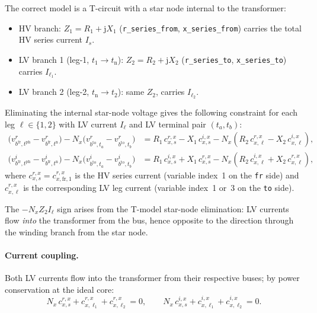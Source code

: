 \documentclass[11pt,a4paper]{article}
\newcommand{\vr}[2]{v^r_{#1,#2}}
\newcommand{\vi}[2]{v^i_{#1,#2}}
\begin{document}
The correct model is a T-circuit with a star node internal to the transformer:
\begin{itemize}
  \item HV branch: $Z_1 = R_1 + \mathrm{j}X_1$
        (\texttt{r\_series\_from}, \texttt{x\_series\_from})
        carries the total HV series current $I_s$.
  \item LV branch 1 (leg-1, $t_1 \to t_\text{n}$): $Z_2 = R_2 + \mathrm{j}X_2$
        (\texttt{r\_series\_to}, \texttt{x\_series\_to}) carries $I_{\ell_1}$.
  \item LV branch 2 (leg-2, $t_\text{n} \to t_2$): same $Z_2$, carries
        $I_{\ell_2}$.
\end{itemize}

Eliminating the internal star-node voltage gives the following constraint
for each leg $\ell \in \{1, 2\}$ with LV current $I_{\ell}$ and LV terminal
pair $(t_a, t_b)$:
%
\begin{align}
  \bigl(\vr{b^\text{fr}}{t^\text{ph}} - \vr{b^\text{fr}}{t^\text{n}}\bigr)
  - N_x\bigl(\vr{b^\text{to}}{t_a} - \vr{b^\text{to}}{t_b}\bigr)
  &= R_1\,c^{r,x}_{x,s} - X_1\,c^{i,x}_{x,s}
     - N_x\!\left(R_2\,c^{r,x}_{x,\ell} - X_2\,c^{i,x}_{x,\ell}\right),
  \label{eq:ct-v-r}\\
  \bigl(\vi{b^\text{fr}}{t^\text{ph}} - \vi{b^\text{fr}}{t^\text{n}}\bigr)
  - N_x\bigl(\vi{b^\text{to}}{t_a} - \vi{b^\text{to}}{t_b}\bigr)
  &= R_1\,c^{i,x}_{x,s} + X_1\,c^{r,x}_{x,s}
     - N_x\!\left(R_2\,c^{i,x}_{x,\ell} + X_2\,c^{r,x}_{x,\ell}\right),
  \label{eq:ct-v-i}
\end{align}
%
where $c^{r,x}_{x,s} = c^{r,x}_{x,\text{fr},1}$ is the HV series current
(variable index~1 on the \texttt{fr} side) and $c^{r,x}_{x,\ell}$ is the
corresponding LV leg current (variable index~1 or~3 on the \texttt{to} side).

The $-N_x Z_2 I_\ell$ sign arises from the T-model star-node elimination:
LV currents flow \emph{into} the transformer from the bus, hence opposite to
the direction through the winding branch from the star node.

\paragraph{Current coupling.}
Both LV currents flow into the transformer from their respective buses;
by power conservation at the ideal core:
%
\begin{equation}
  N_x\,c^{r,x}_{x,s} + c^{r,x}_{x,\ell_1} + c^{r,x}_{x,\ell_2} = 0,
  \qquad
  N_x\,c^{i,x}_{x,s} + c^{i,x}_{x,\ell_1} + c^{i,x}_{x,\ell_2} = 0.
  \label{eq:ct-i}
\end{equation}
\end{document}
